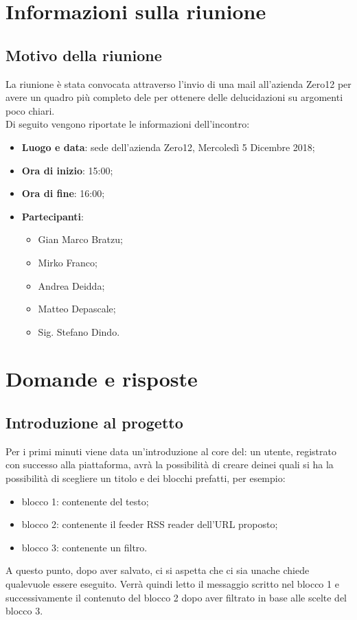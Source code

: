 \documentclass[a4paper,12pt]{article}
\begin{document}
	\cleardoublepage
	\pagestyle{mymain}

	\tableofcontents
	\cleardoublepage

	\section{Informazioni sulla riunione}
	\subsection{Motivo della riunione}
	La riunione è stata convocata attraverso l'invio di una mail all'azienda Zero12 per avere un quadro più completo dele per ottenere delle delucidazioni su argomenti poco chiari. \\
	Di seguito vengono riportate le informazioni dell'incontro:
	\begin{itemize}
		\item \textbf{Luogo e data}: sede dell'azienda Zero12, Mercoledì 5 Dicembre 2018;
		\item \textbf{Ora di inizio}: 15:00;
		\item \textbf{Ora di fine}: 16:00;
		\item \textbf{Partecipanti}:
		\begin{itemize}
		\item Gian Marco Bratzu;
		\item Mirko Franco;
		\item Andrea Deidda;
		\item Matteo Depascale;
		\item Sig. Stefano Dindo.
		\end{itemize}
	\end{itemize}

	\section{Domande e risposte}
	\subsection{Introduzione al progetto}
	Per i primi minuti viene data un'introduzione al core del: un utente, registrato con successo alla piattaforma, avrà la possibilità di creare deinei quali si ha  la possibilità di scegliere un titolo e  dei blocchi prefatti, per esempio:
	\begin{itemize}
		\item blocco 1: contenente del testo;
		\item blocco 2: contenente il feeder RSS reader dell'URL proposto;
		\item blocco 3: contenente un filtro.
	\end{itemize}
	A questo punto, dopo aver salvato, ci si aspetta che ci sia unache chiede qualevuole essere eseguito. Verrà quindi letto il messaggio scritto nel blocco 1 e successivamente il contenuto del blocco 2 dopo aver filtrato in base alle scelte del blocco 3.
\end{document}

